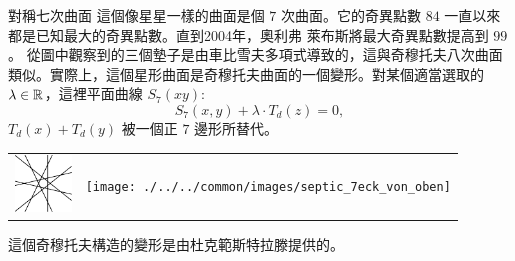 \begin{surferPage}[七次曲面]{對稱七次曲面}
這個像星星一樣的曲面是個 $7$ 次曲面。它的奇異點數 $84$ 一直以來都是已知最大的奇異點數。直到2004年，奧利弗 萊布斯將最大奇異點數提高到 $99$。
從圖中觀察到的三個墊子是由車比雪夫多項式導致的，這與奇穆托夫八次曲面類似。實際上，這個星形曲面是奇穆托夫曲面的一個變形。對某個適當選取的 $\lambda\in{\mathbb R}$，這裡平面曲線 $S_7(xy):$
\[S_7(x,y) + \lambda \cdot T_d(z) = 0,\]
$T_d(x)+T_d(y)$ 被一個正 $7$ 邊形所替代。
\vspace*{-0.3em}
    \begin{center}
      \begin{tabular}{c@{\qquad}c}
        \includegraphics[height=1.5cm]{./../../common/images/labsseptic1.pdf}
        &
        \texttt{[image: ./../../common/images/septic\_7eck\_von\_oben]}
      \end{tabular}
    \end{center}
    \vspace*{-0.3em}
這個奇穆托夫構造的變形是由杜克範斯特拉滕提供的。
\end{surferPage}
